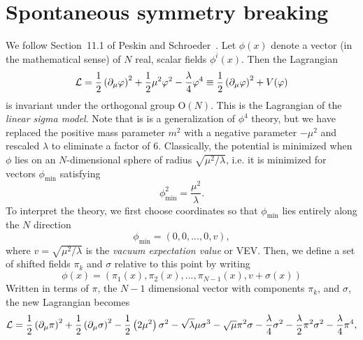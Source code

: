 

\section{Spontaneous symmetry breaking}\label{sec:ssb}
We follow Section~11.1 of Peskin and 
Schroeder~\cite{peskin_introduction_1995}.
Let $\phi(x)$ denote a vector (in the mathematical sense) of $N$ real,
scalar fields $\phi^i(x)$. Then the Lagrangian
\begin{equation}
  \mathcal{L}=\frac{1}{2}\left(\partial_\mu\varphi\right)^2
        +\frac{1}{2}\mu^2\varphi^2-\frac{\lambda}{4}\varphi^4
       \equiv\frac{1}{2}\left(\partial_\mu\varphi\right)^2
        +V(\varphi)
\end{equation}
is invariant under the orthogonal group O$(N)$. 
This is the Lagrangian of the
{\it linear sigma model}. Note that is is a generalization of $\phi^4$ theory,
but we have replaced the positive mass parameter $m^2$ with a
negative parameter $-\mu^2$ and rescaled $\lambda$ to eliminate a factor of 6.
Classically, the potential is minimized when $\phi$ lies
on an $N$-dimensional sphere of radius $\sqrt{\mu^2/\lambda}$, i.e. 
it is minimized for vectors $\phi_\text{min}$ satisfying
\begin{equation}
  \phi_\text{min}^2=\frac{\mu^2}{\lambda}.
\end{equation}
To interpret the theory, we first choose coordinates so that 
$\phi_\text{min}$ lies
entirely along the $N$ direction
\begin{equation}\label{eq:phidir}
  \phi_\text{min}=(0,0,...,0,v),
\end{equation}
where $v=\sqrt{\mu^2/\lambda}$ is the {\it vacuum expectation value} or VEV.
Then, we define a set of shifted fields $\pi_k$ and $\sigma$ relative
to this point by writing
\begin{equation}\label{eq:phishift}
  \phi(x)=\left(\pi_1(x),\pi_2(x),...,\pi_{N-1}(x),v+\sigma(x)\right)
\end{equation}
Written in terms of $\pi$, the $N-1$ dimensional vector with components
$\pi_k$, and $\sigma$, the new Lagrangian becomes
\begin{equation}\label{eq:brokenlagr}
  \mathcal{L}=\frac{1}{2}\left(\partial_\mu\pi\right)^2
        +\frac{1}{2}\left(\partial_\mu\sigma\right)^2
        -\frac{1}{2}\left(2\mu^2\right)\sigma^2-\sqrt{\lambda}\mu\sigma^3
        -\sqrt\mu\pi^2\sigma
        -\frac{\lambda}{4}\sigma^2
        -\frac{\lambda}{2}\pi^2\sigma^2
        -\frac{\lambda}{4}\pi^4,
\end{equation}
